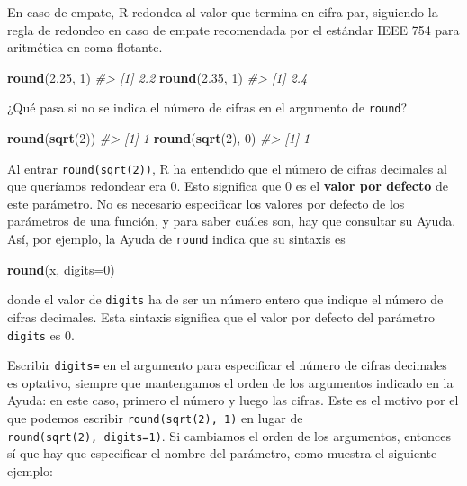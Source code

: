 \documentclass[
]{book}
\newenvironment{Shaded}{\begin{snugshade}}{\end{snugshade}}
\newcommand{\CommentTok}[1]{\textcolor[rgb]{0.56,0.35,0.01}{\textit{#1}}}
\newcommand{\DataTypeTok}[1]{\textcolor[rgb]{0.13,0.29,0.53}{#1}}
\newcommand{\DecValTok}[1]{\textcolor[rgb]{0.00,0.00,0.81}{#1}}
\newcommand{\FloatTok}[1]{\textcolor[rgb]{0.00,0.00,0.81}{#1}}
\newcommand{\KeywordTok}[1]{\textcolor[rgb]{0.13,0.29,0.53}{\textbf{#1}}}
\newcommand{\NormalTok}[1]{#1}
\theoremstyle{definition}
\theoremstyle{definition}
\theoremstyle{definition}
\theoremstyle{remark}
\begin{document}
En caso de empate, R redondea al valor que termina en cifra par, siguiendo la regla de redondeo en caso de empate recomendada por el estándar IEEE 754 para aritmética en coma flotante.

\begin{Shaded}
\begin{Highlighting}[]
\KeywordTok{round}\NormalTok{(}\FloatTok{2.25}\NormalTok{, }\DecValTok{1}\NormalTok{)}
\CommentTok{\#\textgreater{} [1] 2.2}
\KeywordTok{round}\NormalTok{(}\FloatTok{2.35}\NormalTok{, }\DecValTok{1}\NormalTok{)  }
\CommentTok{\#\textgreater{} [1] 2.4}
\end{Highlighting}
\end{Shaded}

¿Qué pasa si no se indica el número de cifras en el argumento de \texttt{round}?

\begin{Shaded}
\begin{Highlighting}[]
\KeywordTok{round}\NormalTok{(}\KeywordTok{sqrt}\NormalTok{(}\DecValTok{2}\NormalTok{)) }
\CommentTok{\#\textgreater{} [1] 1}
\KeywordTok{round}\NormalTok{(}\KeywordTok{sqrt}\NormalTok{(}\DecValTok{2}\NormalTok{), }\DecValTok{0}\NormalTok{) }
\CommentTok{\#\textgreater{} [1] 1}
\end{Highlighting}
\end{Shaded}

Al entrar \texttt{round(sqrt(2))}, R ha entendido que el número de cifras decimales al que queríamos redondear era 0. Esto significa que 0 es el \textbf{valor por defecto} de este parámetro. No es necesario especificar los valores por defecto de los parámetros de una función, y para saber cuáles son, hay que consultar su Ayuda. Así, por ejemplo, la Ayuda de \texttt{round} indica que su sintaxis es

\begin{Shaded}
\begin{Highlighting}[]
\KeywordTok{round}\NormalTok{(x, }\DataTypeTok{digits=}\DecValTok{0}\NormalTok{)}
\end{Highlighting}
\end{Shaded}

donde el valor de \texttt{digits} ha de ser un número entero que indique el número de cifras decimales. Esta sintaxis significa que el valor por defecto del parámetro \texttt{digits} es 0.

Escribir \texttt{digits=} en el argumento para especificar el número de cifras decimales es optativo, siempre que mantengamos el orden de los argumentos indicado en la Ayuda: en este caso, primero el número y luego las cifras. Este es el motivo por el que podemos escribir
\texttt{round(sqrt(2),\ 1)} en lugar de \texttt{round(sqrt(2),\ digits=1)}. Si cambiamos el orden de los argumentos, entonces sí que hay que especificar el nombre del parámetro, como muestra el siguiente ejemplo:
\end{document}
